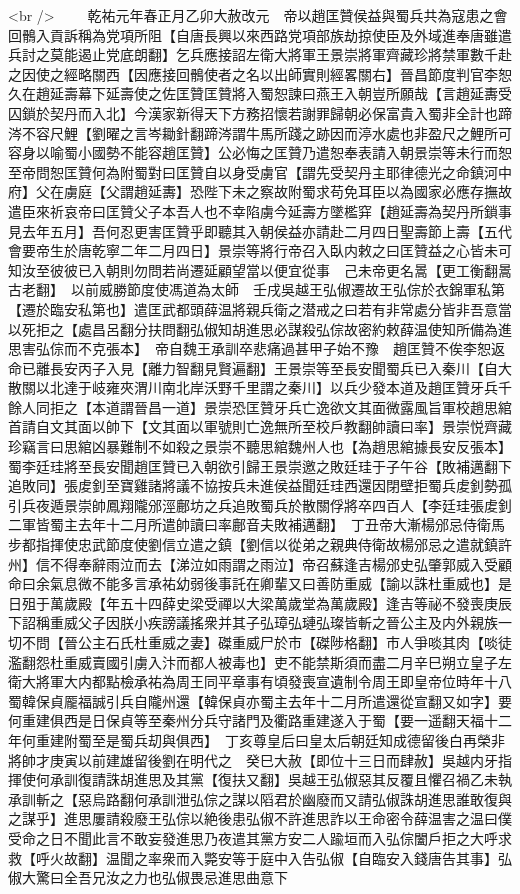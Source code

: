 <br />
　　乾祐元年春正月乙卯大赦改元　帝以趙匡贊侯益與蜀兵共為寇患之會回鶻入貢訴稱為党項所阻【自唐長興以來西路党項部族劫掠使臣及外域進奉唐雖遣兵討之莫能遏止党底朗翻】乞兵應接詔左衛大將軍王景崇將軍齊藏珍將禁軍數千赴之因使之經略關西【因應接回鶻使者之名以出師實則經畧關右】晉昌節度判官李恕久在趙延壽幕下延壽使之佐匡贊匡贊將入蜀恕諫曰燕王入朝豈所願哉【言趙延夀受囚鎖於契丹而入北】今漢家新得天下方務招懷若謝罪歸朝必保富貴入蜀非全計也蹄涔不容尺鯉【劉曜之言岑耡針翻蹄涔謂牛馬所踐之跡因而渟水處也非盈尺之鯉所可容身以喻蜀小國勢不能容趙匡贊】公必悔之匡贊乃遣恕奉表請入朝景崇等未行而恕至帝問恕匡贊何為附蜀對曰匡贊自以身受虜官【謂先受契丹主耶律德光之命鎮河中府】父在虜庭【父謂趙延夀】恐陛下未之察故附蜀求苟免耳臣以為國家必應存撫故遣臣來祈哀帝曰匡贊父子本吾人也不幸陷虜今延壽方墜檻穽【趙延壽為契丹所鎖事見去年五月】吾何忍更害匡贊乎即聽其入朝侯益亦請赴二月四日聖壽節上壽【五代會要帝生於唐乾寧二年二月四日】景崇等將行帝召入臥内敕之曰匡贊益之心皆未可知汝至彼彼已入朝則勿問若尚遷延顧望當以便宜從事　己未帝更名暠【更工衡翻暠古老翻】　以前威勝節度使馮道為太師　壬戌吳越王弘俶遷故王弘倧於衣錦軍私第【遷於臨安私第也】遣匡武都頭薛温將親兵衛之潜戒之曰若有非常處分皆非吾意當以死拒之【處昌呂翻分扶問翻弘俶知胡進思必謀殺弘倧故密約敕薛温使知所備為進思害弘倧而不克張本】　帝自魏王承訓卒悲痛過甚甲子始不豫　趙匡贊不俟李恕返命已離長安丙子入見【離力智翻見賢遍翻】王景崇等至長安聞蜀兵已入秦川【自大散關以北達于岐雍夾渭川南北岸沃野千里謂之秦川】以兵少發本道及趙匡贊牙兵千餘人同拒之【本道謂晉昌一道】景崇恐匡贊牙兵亡逸欲文其面微露風旨軍校趙思綰首請自文其面以帥下【文其面以軍號則亡逸無所至校戶教翻帥讀曰率】景崇悦齊藏珍竊言曰思綰凶暴難制不如殺之景崇不聽思綰魏州人也【為趙思綰據長安反張本】蜀李廷珪將至長安聞趙匡贊已入朝欲引歸王景崇邀之敗廷珪于子午谷【敗補邁翻下追敗同】張䖍釗至寶雞諸將議不協按兵未進侯益聞廷珪西還因閉壁拒蜀兵䖍釗勢孤引兵夜遁景崇帥鳳翔隴邠涇鄜坊之兵追敗蜀兵於散關俘將卒四百人【李廷珪張䖍釗二軍皆蜀主去年十二月所遣帥讀曰率鄜音夫敗補邁翻】　丁丑帝大漸楊邠忌侍衛馬步都指揮使忠武節度使劉信立遣之鎮【劉信以從弟之親典侍衛故楊邠忌之遣就鎮許州】信不得奉辭雨泣而去【涕泣如雨謂之雨泣】帝召蘇逢吉楊邠史弘肇郭威入受顧命曰余氣息微不能多言承祐幼弱後事託在卿輩又曰善防重威【諭以誅杜重威也】是日殂于萬歲殿【年五十四薛史梁受禪以大梁萬歲堂為萬歲殿】逢吉等祕不發喪庚辰下詔稱重威父子因朕小疾謗議搖衆并其子弘璋弘璉弘璨皆斬之晉公主及内外親族一切不問【晉公主石氏杜重威之妻】磔重威尸於市【磔陟格翻】市人爭啖其肉【啖徒濫翻怨杜重威賣國引虜入汴而都人被毒也】吏不能禁斯須而盡二月辛巳朔立皇子左衛大將軍大内都點檢承祐為周王同平章事有頃發喪宣遺制令周王即皇帝位時年十八　蜀韓保貞龎福誠引兵自隴州還【韓保貞亦蜀主去年十二月所遣還從宣翻又如字】要何重建俱西是日保貞等至秦州分兵守諸門及衢路重建遂入于蜀【要一遥翻天福十二年何重建附蜀至是蜀兵刧與俱西】　丁亥尊皇后曰皇太后朝廷知成德留後白再榮非將帥才庚寅以前建雄留後劉在明代之　癸巳大赦【即位十三日而肆赦】吳越内牙指揮使何承訓復請誅胡進思及其黨【復扶又翻】吳越王弘俶惡其反覆且懼召禍乙未執承訓斬之【惡烏路翻何承訓泄弘倧之謀以䧟君於幽廢而又請弘俶誅胡進思誰敢復與之謀乎】進思屢請殺廢王弘倧以絶後患弘俶不許進思詐以王命密令薛温害之温曰僕受命之日不聞此言不敢妄發進思乃夜遣其黨方安二人踰垣而入弘倧闔戶拒之大呼求救【呼火故翻】温聞之率衆而入斃安等于庭中入告弘俶【自臨安入錢唐告其事】弘俶大驚曰全吾兄汝之力也弘俶畏忌進思曲意下